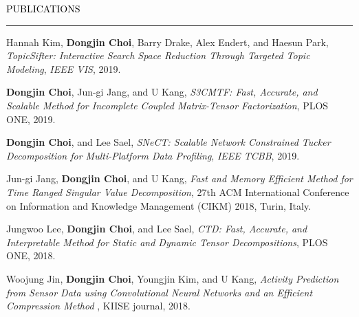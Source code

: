 \documentclass{resume} %
\renewenvironment{rSection}[1]{
	\sectionskip
	\textcolor{Black}{\MakeUppercase{#1}}
	\sectionlineskip
	\hrule
	\begin{list}{}{
			\setlength{\leftmargin}{1.5em}
		}
		\item[]
	}{
	\end{list}
}
\begin{document}
\begin{rSection}{Publications}
	\begin{rSubsection}{}{}{}{}
		\vspace*{-2.5mm}
		
		\item Hannah Kim, \textbf{Dongjin Choi}, Barry Drake, Alex Endert, and Haesun Park, \textit{TopicSifter: Interactive Search Space Reduction Through Targeted Topic Modeling}, \textit{IEEE VIS}, 2019.
		
		\item \textbf{Dongjin Choi}, Jun-gi Jang, and U Kang, \textit{S3CMTF: Fast, Accurate, and Scalable Method for Incomplete Coupled Matrix-Tensor Factorization}, PLOS ONE, 2019.
		
		\item \textbf{Dongjin Choi}, and Lee Sael, \textit{SNeCT: Scalable Network Constrained Tucker Decomposition for Multi-Platform Data Profiling}, \textit{IEEE TCBB}, 2019.
		
		\item Jun-gi Jang, \textbf{Dongjin Choi}, and U Kang, \textit{Fast and Memory Efficient Method for Time Ranged Singular Value Decomposition}, 27th ACM International Conference on Information and Knowledge Management (CIKM) 2018, Turin, Italy.
		
		\item Jungwoo Lee, \textbf{Dongjin Choi}, and Lee Sael, \textit{CTD: Fast, Accurate, and Interpretable Method for Static and Dynamic Tensor Decompositions}, PLOS ONE, 2018.
		
		\item Woojung Jin, \textbf{Dongjin Choi}, Youngjin Kim, and U Kang, \textit{Activity Prediction from Sensor Data using Convolutional Neural Networks and an Efficient Compression Method }, KIISE journal, 2018.
		
	\end{rSubsection}
	
\end{rSection}
\vspace{-3mm}

\end{document}
